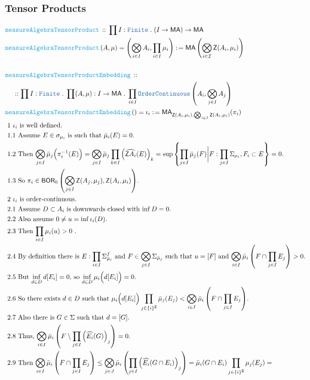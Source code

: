 \documentclass[12pt]{scrartcl}
\newcommand{\TYPE}[1]{\textcolor{NavyBlue}{\mathtt{#1}}}
\newcommand{\FUNC}[1]{\textcolor{Cerulean}{\mathtt{#1}}}
\renewcommand{\.}{\; . \;}
\newcommand{\de}{: \kern 0.1pc =}
\newcommand{\Act}[1]{\left( #1 \right)}
\newcommand{\DeclareFunc}[2]{& \FUNC{#1} \, :: \, #2 \\}
\newcommand{\DefineNamedFunc}[4]{&  \FUNC{#1}\Act{#2} = #3 \de #4 \\}
\newcommand{\NewLine}{\\ & \kern 1pc}
\newcommand{\Page}[1]{ \begin{align*} #1 \end{align*}   }
\renewcommand{\c}{\complement}
\newcommand{\Explain}[1]{& \text{#1.} \\}
\newcommand{\ExplainFurther}[1]{& \text{#1} \\}
\newcommand{\Finite}{\TYPE{Finite}}
\newcommand{\I}{\mathcal{I}}
\newcommand{\oC}{\TYPE{OrderContinuous}}
\newcommand{\Z}{\mathsf{Z}}
\newcommand{\BOR}{\mathsf{BOR}}
\newcommand{\ma}{\mathsf{MA}}
\begin{document}
\subsubsection{Tensor Products}
\Page{
	\DeclareFunc{measureAlgebraTensorProduct}
	{
		\prod I : \Finite \. (I \to \ma) \to \ma
	}
	\DefineNamedFunc{measureAlgebraTensorProduct}{A,\mu}{
		\left(\bigotimes_{i \in I} A_i, \prod_{i \in I} \mu_i\right)}
		{
					\ma\left( \bigotimes_{i \in \I} \Z(A_i,\mu_i) \right)
		}
		\\
	\DeclareFunc{measureAlgebraTensorProductEmbedding}
	{
		\NewLine ::		
		\prod I : \Finite \. 
		\prod (A,\mu) : I \to \ma \.
		\prod_{i \in I} \oC\left( A_i , \bigotimes_{j \in I} A_j \right)
	} 
	\DefineNamedFunc{measureAlgebraTensorProductEmbedding}{}{\iota_i}
	{
		\ma_{\Z(A_i,\mu_i),\bigotimes_{i \in I} \Z(A_i,\mu_i)}( \pi_i   )
	}
	\Explain{ 1 $\iota_i$ is well defined}
	\Explain{ 1.1 Assume $E \in  \sigma_{\mu_i}$ 
		is such that $\bar \mu_i(E) = 0$}
	\Explain{ 1.2 Then   
		$\bigotimes_{j \in I} \bar \mu_j \Big(\pi_i^{-1}(E) \Big) = 
		   \bigotimes_{j \in I} \bar \mu_j \prod_{k \in I} \Big(\widehat{\Z A_i}(E)\Big)_k =
			\sup  \left\{ \prod_{j \in I} \bar \mu_j(F) \bigg| 
				F : \prod_{j \in I} \Sigma_{\mu_i}, F_i \subset   E \right\} = 0		
		$}
	\Explain{ 1.3 So $\pi_i \in \BOR_0\left( \bigotimes_{j \in I} \Z(A_j,\mu_j) , \Z(A_i,\mu_i)\right)$}
	\Explain{ 2 $\iota_i$ is order-continuous}
	\Explain{ 2.1 Assume $D \subset A_i$ is downwards closed with $\inf D = 0$}
	\Explain{ 2.2 Also assume $0 \neq u = \inf \iota_i(D)$}
	\Explain{ 2.3 Then $\prod_{i \in I} \mu_i (u) > 0 $ }
	\Explain{ 2.4 By definition there is $E : \prod_{i \in I} \Sigma_{\bar \mu_i}^f$
			 and $F \in \bigotimes_{j \in I} \Sigma_{\bar \mu_j}$ such that $u = [F]$	
			 and $\bigotimes_{i \in I} \bar \mu_i \left( F \cap \prod_{j \in I} E_j \right) > 0$}
	\Explain{ 2.5 But $\inf_{d \in D} d [E_i]  = 0$, so $\inf_{d \in D} \mu_i\Big(d[E_i]\Big) = 0$}
	\Explain{ 2.6 So there exists $d \in D$ such that 
	$\mu_i\Big(d[E_i]\Big)\prod_{j \in \{i\}^\c} \bar \mu_j(E_j) 
	< \bigotimes_{i \in I}  \bar \mu_i \left( F \cap \prod_{j \in I} E_j \right)$}
	\Explain{ 2.7 Also there is $G \in \Sigma$ such that $d = [G]$}
	\Explain{ 2.8 Thus, $\bigotimes_{i \in I} \bar 
		\mu_i\left( F \setminus \prod_{j \in I} \Big(\widehat{E_i}(G)\Big)_j \right) = 0$}
	\ExplainFurther{
		2.9 Then
		$ 
		\bigotimes_{i \in I} \bar \mu_i \left( F \cap \prod_{j \in I} E_j \right) \le
		\bigotimes_{j \in J} \bar \mu_i\left(  \prod_{j \in I}\Big(\widehat{E_i}(G \cap E_i)\Big)_j \right) =
		\bar \mu_i( G \cap E_i) \prod_{j \in \{i\}^\c} \mu_j(E_j) = $}
}
\end{document}
